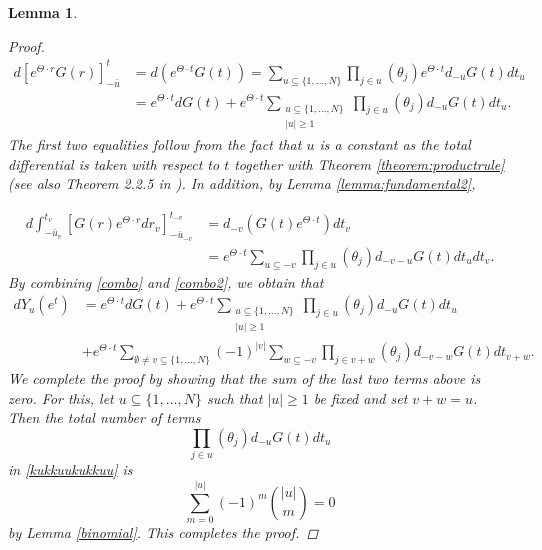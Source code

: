 \documentclass[english, a4paper, 12pt,reqno]{amsart}
\newtheorem{lemma}[defi]{Lemma}
\begin{document}
\begin{lemma}
\begin{proof}
\begin{equation}
\begin{split}
d [e^{\Theta\cdot r} G(r)]_{-\bar{u}}^t &= d(e^{\Theta \cdot t} G(t)) = \sum_{u\subseteq \{1,\dots,N\}} \prod_{j\in u} (\theta_j) e^{\Theta \cdot t} d_{-u}G(t) dt_u\\
&= e^{\Theta \cdot t} dG(t) + e^{\Theta \cdot t}\sum_{\substack{u\subseteq \{1,\dots,N\}\\ |u| \geq 1} } \prod_{j\in u} (\theta_j)  d_{-u}G(t) dt_u.
\end{split}
\end{equation}
The first two equalities follow from the fact that $u$ is a constant as the total differential is taken with respect to $t$ together with Theorem \ref{theorem:productrule} (see also Theorem 2.2.5 in \cite{prause2015sequential}). In addition, by Lemma \ref{lemma:fundamental2},

\begin{equation}
\label{combo2}
\begin{split}
d  \int_{-\bar{u}_v}^{t_v} [ G(r)e^{\Theta\cdot r} dr_v]_{-\bar{u}_{-v}}^{t_{-v}} &= 
 d_{-v}\left( G(t) e^{\Theta\cdot t} \right)dt_v\\
&= e^{\Theta \cdot t} \sum_{u\subseteq -v} \prod_{j\in u} (\theta_j) d_{-v-u} G(t) dt_u dt_v.
\end{split}
\end{equation}
By combining \eqref{combo} and \eqref{combo2}, we obtain that
\begin{equation}
\label{kukkuukukkuu}
\begin{split}
dY_u(e^t) &= e^{\Theta \cdot t} dG(t) + e^{\Theta \cdot t}\sum_{\substack{u\subseteq \{1,\dots,N\}\\ |u| \geq 1} } \prod_{j\in u} (\theta_j)  d_{-u}G(t) dt_u\\
&+ e^{\Theta \cdot t} \sum_{\emptyset\neq v \subseteq \{1,\dots,N\}}(-1)^{|v|}\sum_{w\subseteq -v} \prod_{j\in v+w} (\theta_j) d_{-v-w} G(t) dt_{v+w}.
\end{split}
\end{equation}
We complete the proof by showing that the sum of the last two terms above is zero. For this, let $u\subseteq \{1,\dots,N\}$ such that $|u| \geq 1$ be fixed and set $v+w = u$. Then the total number of terms
$$\prod_{j\in u} (\theta_j)  d_{-u}G(t) dt_u$$
in \eqref{kukkuukukkuu} is 
\begin{equation*}
\sum_{m=0}^{|u|} (-1)^m\binom{|u|}{m} = 0
\end{equation*}
by Lemma \ref{binomial}. This completes the proof.
\end{proof}
\end{lemma}
\end{document}
